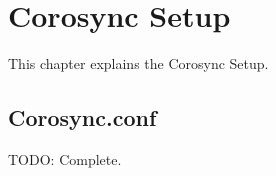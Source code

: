 

\chapter{Corosync Setup}
This chapter explains the Corosync Setup.

\section {Corosync.conf}

TODO: Complete. 